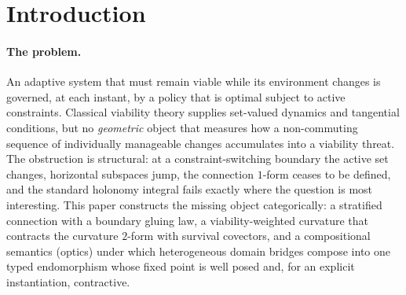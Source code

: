 \documentclass[11pt,a4paper]{article}
\theoremstyle{plain}
\theoremstyle{definition}
\theoremstyle{remark}
\begin{document}
\tableofcontents
\newpage

\section{Introduction}\label{sec:role}

\paragraph{The problem.}
An adaptive system that must remain viable while its environment
changes is governed, at each instant, by a policy that is optimal
subject to active constraints. Classical viability theory supplies
set-valued dynamics and tangential conditions, but no
\emph{geometric} object that measures how a non-commuting sequence
of individually manageable changes accumulates into a viability
threat. The obstruction is structural: at a constraint-switching
boundary the active set changes, horizontal subspaces jump, the
connection $1$-form ceases to be defined, and the standard holonomy
integral fails exactly where the question is most interesting. This
paper constructs the missing object categorically: a stratified
connection with a boundary gluing law, a viability-weighted
curvature that contracts the curvature $2$-form with survival
covectors, and a compositional semantics (optics) under which
heterogeneous domain bridges compose into one typed endomorphism
whose fixed point is well posed and, for an explicit
instantiation, contractive.
\end{document}
